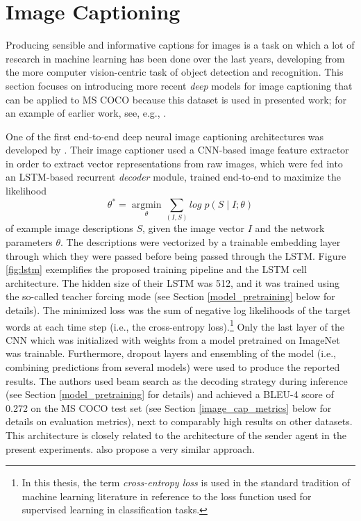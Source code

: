 \section{Image Captioning}
\label{image_captioning}
Producing sensible and informative captions for images is a task on which a lot of research in machine learning has been done over the last years, developing from the more computer vision-centric task of object detection and recognition. 
This section focuses on introducing more recent \textit{deep} models \parencite{lecun2015deep} for image captioning that can be applied to MS COCO because this dataset is used in presented work; for an example of earlier work, see, e.g., \cite{kulkarni2013babytalk}.

One of the first end-to-end deep neural image captioning architectures was developed by \cite{vinyals2015show}. Their image captioner used a CNN-based image feature extractor in order to extract vector representations from raw images, which were fed into an LSTM-based recurrent \textit{decoder} module, trained end-to-end to maximize the likelihood 
\begin{equation}
\theta^* = \operatorname*{argmin}_\theta \sum_{(I, S)} log\; p(S \mid I; \theta) 
\end{equation}
of example image descriptions $S$, given the image vector $I$ and the network parameters $\theta$. The descriptions were vectorized by a trainable embedding layer through which they were passed before being passed through the LSTM. Figure \ref{fig:lstm} exemplifies the proposed training pipeline and the LSTM cell architecture. The hidden size of their LSTM was 512, and it was trained using the so-called teacher forcing mode (see Section \ref{model_pretraining} below for details). The minimized loss was the sum of negative log likelihoods of the target words at each time step (i.e., the cross-entropy loss).\footnote{In this thesis, the term \emph{cross-entropy loss} is used in the standard tradition of machine learning literature in reference to the loss function used for supervised learning in classification tasks.} Only the last layer of the CNN which was initialized with weights from a model pretrained on ImageNet was trainable. Furthermore, dropout layers and ensembling of the model (i.e., combining predictions from several models) were used to produce the reported results. The authors used beam search as the decoding strategy during inference (see Section \ref{model_pretraining} for details) and achieved a BLEU-4 score of 0.272 on the MS COCO test set (see Section \ref{image_cap_metrics} below for details on evaluation metrics), next to comparably high results on other datasets. 
This architecture is closely related to the architecture of the sender agent in the present experiments. \cite{donahue2015long} also propose a very similar approach.

